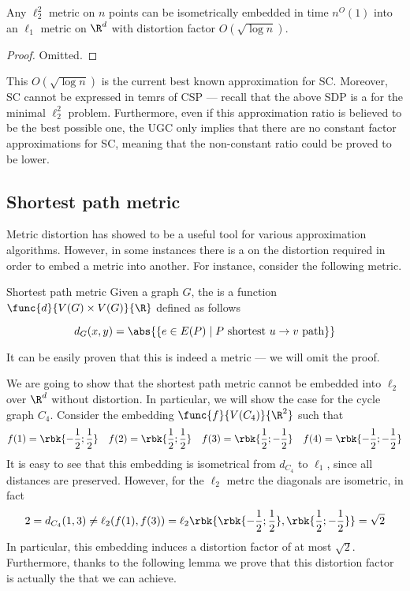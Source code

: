 \documentclass[a4paper, 12pt]{report}
\begin{document}
    \begin{framedprop}{}
        Any $\ell_2^2$ metric on $n$ points can be isometrically embedded in time $n^O(1)$ into an $\ell_1$ metric on $\R^d$ with distortion factor $O(\sqrt{\log n})$.
    \end{framedprop}

    \begin{proof}
        Omitted.
    \end{proof}

    This $O(\sqrt{\log n})$ is the current best known approximation for SC. Moreover, SC cannot be expressed in temrs of CSP --- recall that the above SDP is a  for the minimal $\ell_2^2$ problem. Furthermore, even if this approximation ratio is believed to be the best possible one, the UGC only implies that there are no constant factor approximations for SC, meaning that the non-constant ratio could be proved to be lower.

    \subsection{Shortest path metric}

    Metric distortion has showed to be a useful tool for various approximation algorithms. However, in some instances there is a  on the distortion required in order to embed a metric into another. For instance, consider the following metric.

    \begin{frameddefn}{Shortest path metric}
        Given a graph $G$, the  is a function $\func{d}{V(G) \times V(G)}{\R}$ defined as follows

        $$d_G(x, y) = \abs{\{e \in E(P) \mid P \ \mathrm{shortest} \ u \to v \ \mathrm{path}\}}$$
    \end{frameddefn}

    It can be easily proven that this is indeed a metric --- we will omit the proof.

    We are going to show that the shortest path metric cannot be embedded into $\ell_2$ over $\R^d$ without distortion. In particular, we will show the case for the cycle graph $C_4$. Consider the embedding $\func{f}{V(C_4)}{\R^2}$ such that $$f(1) = \rbk{-\dfrac{1}{2}; \dfrac{1}{2}} \quad f(2) = \rbk{\dfrac{1}{2}; \dfrac{1}{2}} \quad f(3) =\rbk{\dfrac{1}{2}; -\dfrac{1}{2}} \quad f(4) = \rbk{-\dfrac{1}{2}; -\dfrac{1}{2}}$$ It is easy to see that this embedding is isometrical from $d_{C_4}$ to $\ell_1$, since all distances are preserved. However, for the $\ell_2$ metrc the diagonals are  isometric, in fact $$2 = d_{C_4}(1, 3) \neq \ell_2(f(1), f(3)) = \ell_2 \rbk{\rbk{-\dfrac{1}{2}; \dfrac{1}{2}},\rbk{\dfrac{1}{2}; -\dfrac{1}{2}}} = \sqrt 2$$ In particular, this embedding induces a distortion factor of at most $\sqrt 2$. Furthermore, thanks to the following lemma we prove that this distortion factor is actually the  that we can achieve.
\end{document}

